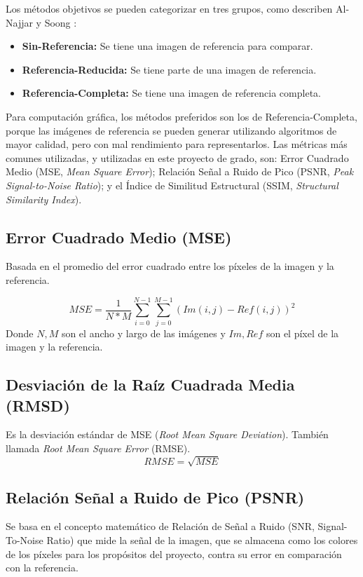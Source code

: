 \documentclass[pregrado]{tesis-usb} %
\begin{document}
Los métodos objetivos se pueden categorizar en tres grupos, como describen Al-Najjar y Soong \cite{Yusra2012}:

\begin{itemize}
	\item \textbf{Sin-Referencia:} Se tiene una imagen de referencia para comparar.
	\item \textbf{Referencia-Reducida:} Se tiene parte de una imagen de referencia.
	\item \textbf{Referencia-Completa:} Se tiene una imagen de referencia completa.
\end{itemize}



Para computación gráfica, los métodos preferidos son los de Referencia-Completa, porque las imágenes de referencia se pueden generar utilizando algoritmos de mayor calidad, pero con mal rendimiento para representarlos. Las métricas más comunes utilizadas, y utilizadas en este proyecto de grado, son: Error Cuadrado Medio (MSE, \textit{Mean Square Error}); Relación Señal a Ruido de Pico (PSNR, \textit{Peak Signal-to-Noise Ratio}); y el Índice de Similitud Estructural  (SSIM, \textit{Structural Similarity Index}).

\subsection{Error Cuadrado Medio (MSE)}
Basada en el promedio del error cuadrado entre los píxeles de la imagen y la referencia. 

\begin{equation}\label{eq:mse}
	MSE=\frac{1}{N*M}\sum\limits_{i=0}^{N-1}\sum\limits_{j=0}^{M-1}(Im(i,j)-Ref(i,j))^2
\end{equation}
Donde $N, M$ son el ancho y largo de las imágenes y $Im, Ref$ son el píxel de la imagen y la referencia.

\subsection{Desviación de la Raíz Cuadrada Media  (RMSD)}
Es la desviación estándar de MSE (\textit{Root Mean Square Deviation}). También llamada \textit{Root Mean Square Error} (RMSE).
\begin{equation}\label{eq:rmse}
RMSE=\sqrt{MSE}
\end{equation}

\subsection{Relación Señal a Ruido de Pico (PSNR)}
Se basa en el concepto matemático de Relación de Señal a Ruido (SNR, Signal-To-Noise Ratio) que mide la señal de la imagen, que se almacena como los colores de los píxeles para los propósitos del proyecto, contra su error en comparación con la referencia. \cite{Yusra2012}
\end{document}
